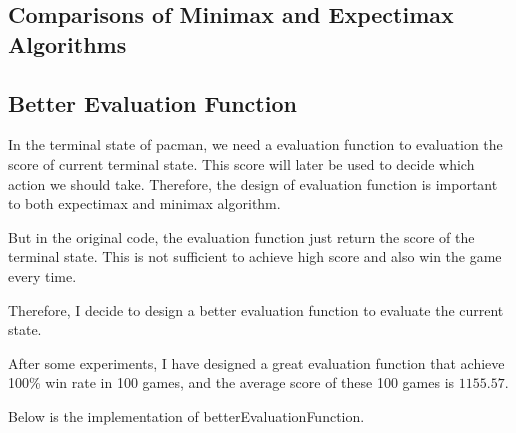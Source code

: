 \documentclass{article}[12pt]
\begin{document}
\subsection{Comparisons of Minimax and Expectimax Algorithms}
\subsection{Better Evaluation Function}
In the terminal state of pacman, we need a evaluation function to evaluation the score of current terminal state. 
This score will later be used to decide which action we should take.
Therefore, the design of evaluation function is important to both 
expectimax and minimax algorithm.

But in the original code, the evaluation function just return the score of the terminal state. 
This is not sufficient to achieve high score and also win the game every time.

Therefore, I decide to design a better evaluation function to evaluate the current state.

After some experiments, I have designed a great evaluation function that achieve 100\% win rate in 100 games, and the average score of these 100 games is $1155.57$. 

Below is the implementation of betterEvaluationFunction.
\end{document}
